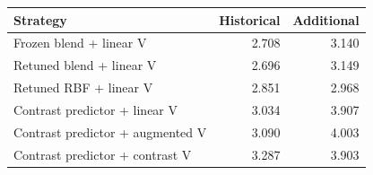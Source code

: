 \begin{tabular}{lrr}\toprule Strategy & Historical & Additional\\\midrule
Frozen blend + linear V & 2.708 & 3.140\\
Retuned blend + linear V & 2.696 & 3.149\\
Retuned RBF + linear V & 2.851 & 2.968\\
Contrast predictor + linear V & 3.034 & 3.907\\
Contrast predictor + augmented V & 3.090 & 4.003\\
Contrast predictor + contrast V & 3.287 & 3.903\\
\bottomrule\end{tabular}